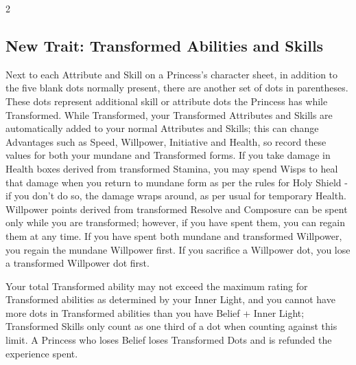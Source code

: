 \begin{multicols}{2}




\subsection*{New Trait: Transformed Abilities and Skills}
\label{subsec:TransformedAbilitiesAndSkills} 
Next to each Attribute and Skill on a Princess's character sheet, in addition to the five blank dots normally present, there are another set of dots in parentheses. These dots represent additional skill or attribute dots the Princess has while Transformed. While Transformed, your Transformed Attributes and Skills are automatically added to your normal Attributes and Skills; this can change Advantages such as Speed, Willpower, Initiative and Health, so record these values for both your mundane and Transformed forms. If you take damage in Health boxes derived from transformed Stamina, you may spend Wisps to heal that damage when you return to mundane form as per the rules for Holy Shield - if you don't do so, the damage wraps around, as per usual for temporary Health. Willpower points derived from transformed Resolve and Composure can be spent only while you are transformed; however, if you have spent them, you can regain them at any time. If you have spent both mundane and transformed Willpower, you regain 
the 
mundane Willpower first. If you sacrifice a Willpower dot, you lose a transformed Willpower dot first.

Your total Transformed ability may not exceed the maximum rating for Transformed abilities as determined by your Inner Light, and you cannot have more dots in Transformed abilities than you have Belief + Inner Light; Transformed Skills only count as one third of a dot when counting against this limit. A Princess who loses Belief loses Transformed Dots and is refunded the experience spent.


\end{multicols}
